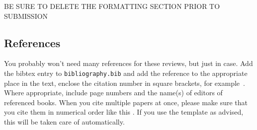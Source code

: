 \documentclass[10pt,twocolumn,letterpaper]{article}
\begin{document}
{\Large BE SURE TO DELETE THE FORMATTING SECTION PRIOR TO SUBMISSION}

\subsection{References}

You probably won't need many references for these reviews, but just in case. Add the bibtex entry to \verb|bibliography.bib| and add the reference to the appropriate place in the text, enclose the citation number in square brackets, for
example~\cite{Authors14}. 
Where appropriate, include page numbers and the name(s) of editors of referenced books.
When you cite multiple papers at once, please make sure that you cite them in numerical order like this \cite{Alpher02,Alpher03,Alpher05}.
If you use the template as advised, this will be taken care of automatically.

{\small


}
\end{document}
